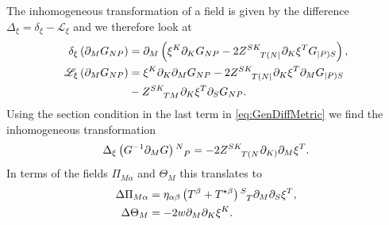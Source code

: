 The inhomogeneous transformation of a field is given by the difference $\Delta_\xi = \delta_\xi-\mathscr{L}_\xi$ and we therefore look at 
\begin{align}
    \delta_\xi \left(\pd_MG_{NP}\right) &= \pd_M\left(\xi^K\pd_KG_{NP}-2\tensor{Z}{^{SK}_{T(N|}}\pd_K\xi^TG_{|P)S}\right),\\
    \mathscr{L}_\xi \left(\pd_MG_{NP}\right) &= \xi^K\pd_K\pd_MG_{NP}-2\tensor{Z}{^{SK}_{T(N|}}\pd_K\xi^T\pd_MG_{|P)S}\nonumber\\
        &-\tensor{Z}{^{SK}_{TM}}\pd_K\xi^T\pd_SG_{NP}. \label{eq:GenDiffMetric}
\end{align}
Using the section condition in the last term in \eqref{eq:GenDiffMetric} we find the inhomogeneous transformation 
\begin{equation}
    \Delta_\xi \left(G^{-1}\pd_MG\right)\tensor{}{^N_P} = -2\tensor{Z}{^{SK}_{T(N}}\pd_{K)}\pd_M\xi^T.
\end{equation}
In terms of the fields $\Pi_{M\alpha}$ and $\Theta_M$ this translates to 
\begin{align}
    \Delta \Pi_{M\alpha} &= \eta_{\alpha\beta}\left(T^\beta+T^{\star\beta}\right)\tensor{}{^S_T}\pd_M\pd_S\xi^T,\\
    \Delta \Theta_M &= -2w\pd_M\pd_K\xi^K.
\end{align}

